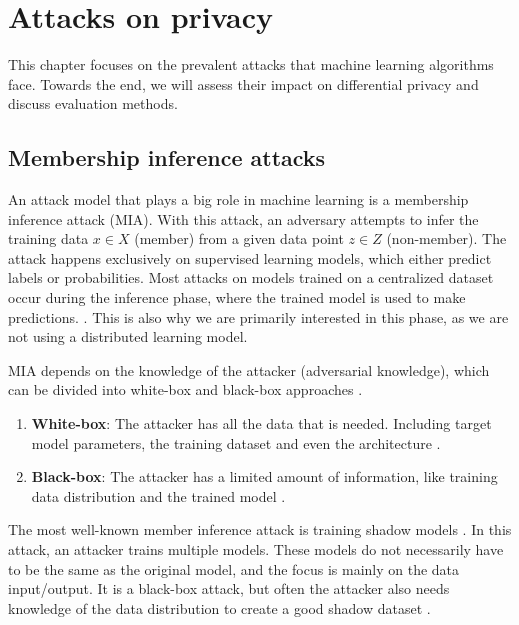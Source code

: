 \chapter{Attacks on privacy} \label{section: MIA}
This chapter focuses on the prevalent attacks that machine learning algorithms face. Towards the end, we will assess their impact on differential privacy and discuss evaluation methods.
\section{Membership inference attacks}
An attack model that plays a big role in machine learning is a membership inference attack (MIA).
With this attack, an adversary attempts to infer the training data $x \in X$ (member) from a given data point $z \in Z$ (non-member).
The attack happens exclusively on supervised learning models, which either predict labels or probabilities.
Most attacks on models trained on a centralized dataset occur during the inference phase, where the trained model is used to make predictions. \citep{rigaki_survey_2021}.
This is also why we are primarily interested in this phase, as we are not using a distributed learning model.

MIA depends on the knowledge of the attacker (adversarial knowledge), which can be divided into white-box and black-box approaches \citep{hu_membership_2022}.
\begin{enumerate}
  \item \textbf{White-box}: The attacker has all the data that is needed. Including target model parameters, the training dataset and even the architecture \citep{hu_membership_2022}.
  \item \textbf{Black-box}: The attacker has a limited amount of information, like training data distribution and the trained model \citep{hu_membership_2022}.
\end{enumerate}
The most well-known member inference attack is training shadow models \citep{rigaki_survey_2021}.
In this attack, an attacker trains multiple models.
These models do not necessarily have to be the same as the original model, and the focus is mainly on the data input/output.
It is a black-box attack, but often the attacker also needs knowledge of the data distribution to create a good shadow dataset \citep{rigaki_survey_2021}.

